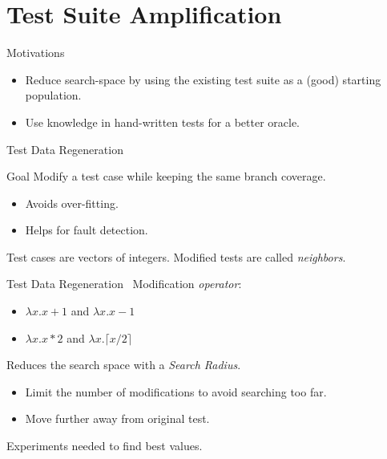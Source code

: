 \documentclass{beamer}
\begin{document}
\section{Test Suite Amplification}

\begin{frame}{Motivations~\cite{danglot2017emerging}}
  \begin{itemize}
    \item Reduce search-space by using the existing test suite as a (good) starting population.
    \item Use knowledge in hand-written tests for a better oracle.
  \end{itemize}
\end{frame}

\begin{frame}{Test Data Regeneration~\cite{yoo2012test}}
  \begin{block}{Goal}
    Modify a test case while keeping the same branch coverage.
    \begin{itemize}
      \item Avoids over-fitting.
      \item Helps for fault detection.
    \end{itemize}
  \end{block}

  Test cases are vectors of integers.
  Modified tests are called \emph{neighbors}.
\end{frame}
\begin{frame}{Test Data Regeneration~\cite{yoo2012test}}
  Modification \emph{operator}:
  \begin{itemize}
    \item $\lambda x. x + 1$ and $\lambda x. x - 1$
    \item $\lambda x. x * 2$ and $\lambda x. \lceil x / 2\rceil$
  \end{itemize}

  Reduces the search space with a \emph{Search Radius}.
  \begin{itemize}
    \item Limit the number of modifications to avoid searching too far.
    \item Move further away from original test.
  \end{itemize}

  \vfill

  Experiments needed to find best values.
\end{frame}
\end{document}
